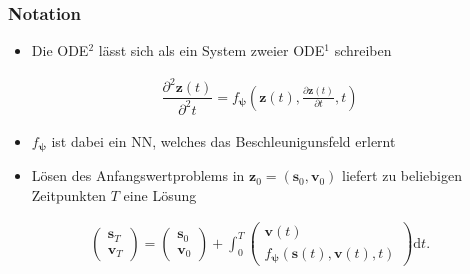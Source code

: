 \begin{frame}
\frametitle{Notation}
    \begin{itemize}
    	\item Die ODE$^{2}$ lässt sich als ein System zweier ODE$^{1}$ schreiben
    \end{itemize}	
    {\footnotesize\begin{align*}
	    \dfrac{\partial^2 \mathbf{z}(t)}{\partial^2 t}=f_{\boldsymbol{\psi}}\left(\mathbf{z}(t), \tfrac{\partial \mathbf{z}(t)}{\partial t}, t\right)%
	\end{align*}}
    \begin{itemize}
    	\item $f_{\boldsymbol{\psi}}$ ist dabei ein NN, welches das Beschleunigunsfeld erlernt
    	\item Lösen des Anfangswertproblems in $\mathbf{z}_{0}=(\mathbf{s}_{0}, \mathbf{v}_{0})$ liefert zu beliebigen Zeitpunkten $T$ eine Lösung
	\end{itemize}
    {\footnotesize\begin{align*}
    \left(\begin{array}{cc}
    \mathbf s_{T} \\
    \mathbf v_{T}
    \end{array}\right)
    =
    \left(\begin{array}{cc}
    \mathbf s_{0} \\
    \mathbf v_{0}
    \end{array}\right)
    +
    \int_{0}^{T}
    \left(\begin{array}{cc}
    \mathbf v(t) \\
    f_{\boldsymbol{\psi}}(\mathbf s(t), \mathbf v(t), t)
    \end{array}\right)
    \mathrm{d}t.
    \end{align*}}
\end{frame}




